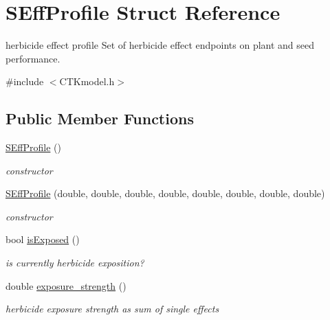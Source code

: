 \hypertarget{struct_s_eff_profile}{}\section{S\+Eff\+Profile Struct Reference}
\label{struct_s_eff_profile}


herbicide effect profile Set of herbicide effect endpoints on plant and seed performance.  




{\ttfamily \#include $<$C\+T\+Kmodel.\+h$>$}

\subsection*{Public Member Functions}
\begin{DoxyCompactItemize}
\item 
\mbox{\hyperlink{struct_s_eff_profile_aed86adf4491dd80364149278a15d5ed4}{S\+Eff\+Profile}} ()
\begin{DoxyCompactList}\small\item\em constructor \end{DoxyCompactList}\item 
\mbox{\hyperlink{struct_s_eff_profile_ad7e6450c568191c89494222bd802931b}{S\+Eff\+Profile}} (double, double, double, double, double, double, double, double)
\begin{DoxyCompactList}\small\item\em constructor \end{DoxyCompactList}\item 
\mbox{\label{struct_s_eff_profile_a7fb81b67ca4ee121b7649c1bb279415b}} 
bool \mbox{\hyperlink{struct_s_eff_profile_a7fb81b67ca4ee121b7649c1bb279415b}{is\+Exposed}} ()
\begin{DoxyCompactList}\small\item\em is currently herbicide exposition? \end{DoxyCompactList}\item 
\mbox{\label{struct_s_eff_profile_a63ddedfabcf582fd370678cd1021a8f6}} 
double \mbox{\hyperlink{struct_s_eff_profile_a63ddedfabcf582fd370678cd1021a8f6}{exposure\+\_\+strength}} ()
\begin{DoxyCompactList}\small\item\em herbicide exposure strength as sum of single effects \end{DoxyCompactList}\end{DoxyCompactItemize}
